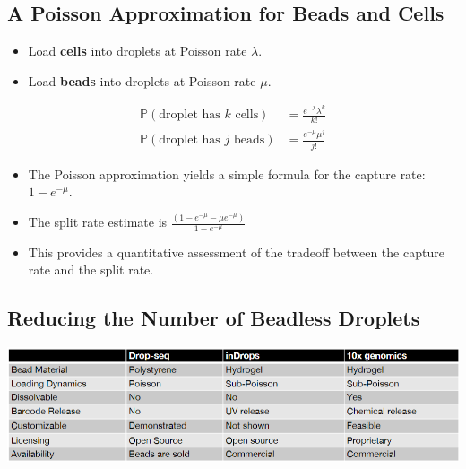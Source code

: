 \documentclass[10pt]{article}
\begin{document}
\subsection*{A Poisson Approximation for Beads and Cells}
\begin{itemize}
    \item Load \textbf{cells} into droplets at Poisson rate $\lambda$.
    \item Load \textbf{beads} into droplets at Poisson rate $\mu$.
\end{itemize}
\begin{align*}
    \mathbb{P}(\text{droplet has $k$ cells}) &= \frac{e^{-\lambda} \lambda^k}{k!}\\
    \mathbb{P}(\text{droplet has $j$ beads}) &= \frac{e^{-\mu} \mu^j}{j!}
\end{align*}
\begin{itemize}
    \item The Poisson approximation yields a simple formula for the capture rate: $1 - e^{-\mu}$.
    \item The split rate estimate is $\frac{(1 - e^{-\mu} - \mu e^{-\mu})}{1 - e^{-\mu}}$
    \item This provides a quantitative assessment of the tradeoff between the capture rate and the split rate.
\end{itemize}

\subsection*{Reducing the Number of Beadless Droplets}
\begin{center}
    \includegraphics*[scale=0.63]{W7_4.png}
\end{center}    
\end{document}
